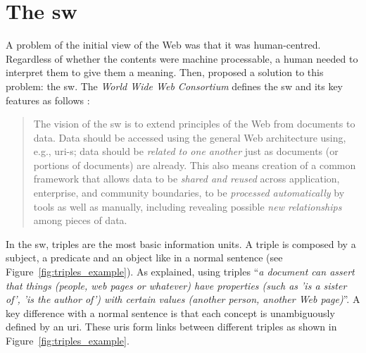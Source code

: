 \section{The \acl{sw}}
\label{sec:soa_sw}

A problem of the initial view of the Web was that it was human-centred.
Regardless of whether the contents were machine processable, a human needed to interpret them to give them a meaning.
Then, \citet{berners-lee_semantic_2001} proposed a solution to this problem: the \acf{sw}.
The \emph{World Wide Web Consortium} defines the \ac{sw} and its key features as follows \citep{semanticWeb-FAQ}:
\begin{quote}
The vision of the \acl{sw} is to extend principles of the Web from documents to data.
Data should be accessed using the general Web architecture using, e.g., \acs{uri}-s;
data should be \emph{related to one another} just as documents (or portions of documents) are already.
This also means creation of a common framework that allows data to be \emph{shared and reused} across application, enterprise, and community boundaries,
to be \emph{processed automatically} by tools as well as manually, including revealing possible \emph{new relationships} among pieces of data.
\end{quote}


In the \ac{sw}, triples are the most basic information units.
A triple is composed by a subject, a predicate and an object like in a normal sentence (see Figure~\ref{fig:triples_example}).
As \citeauthor{berners-lee_semantic_2001} explained, using triples ``\emph{a document can assert that things (people, web pages or whatever) have properties (such as 'is a sister of', 'is the author of') with certain values (another person, another Web page)}''.
A key difference with a normal sentence is that each concept is unambiguously defined by an \acs{uri}.
These \acsp{uri} form links between different triples as shown in Figure~\ref{fig:triples_example}.



